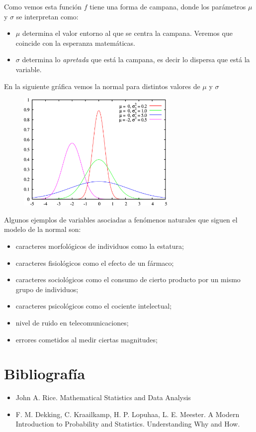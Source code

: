 \documentclass[]{book}
\providecommand{\tightlist}{%
  \setlength{\itemsep}{0pt}\setlength{\parskip}{0pt}}
\theoremstyle{plain}
\theoremstyle{definition}
\theoremstyle{definition} %
\begin{document}
Como vemos esta función \(f\) tiene una forma de campana, donde los
parámetros \(\mu\) y \(\sigma\) se interpretan como:

\begin{itemize}
\item
  \(\mu\) determina el valor entorno al que se centra la campana.
  Veremos que coincide con la esperanza matemáticas.
\item
  \(\sigma\) determina lo \emph{apretada} que está la campana, es decir
  lo dispersa que está la variable.
\end{itemize}

En la siguiente gráfica vemos la normal para distintos valores de
\(\mu\) y \(\sigma\)


\begin{figure}
  \centering
  \includegraphics[width=3in,height=\textheight]{img/normal2.png}
  \caption{ }
\end{figure}
 

Algunos ejemplos de variables asociadas a fenómenos naturales que siguen
el modelo de la normal son:

\begin{itemize}
\item
  caracteres morfológicos de individuos como la estatura;
\item
  caracteres fisiológicos como el efecto de un fármaco;
\item
  caracteres sociológicos como el consumo de cierto producto por un
  mismo grupo de individuos;
\item
  caracteres psicológicos como el cociente intelectual;
\item
  nivel de ruido en telecomunicaciones;
\item
  errores cometidos al medir ciertas magnitudes;
\end{itemize}

\hypertarget{bibliografuxeda}{%
\section{Bibliografía}\label{bibliografuxeda}}

\begin{itemize}
\tightlist
\item
  John A. Rice. Mathematical Statistics and Data Analysis
\item
  F. M. Dekking, C. Kraailkamp, H. P. Lopuhaa, L. E. Meester. A Modern
  Introduction to Probability and Statistics. Understanding Why and How.
\end{itemize}
\end{document}

